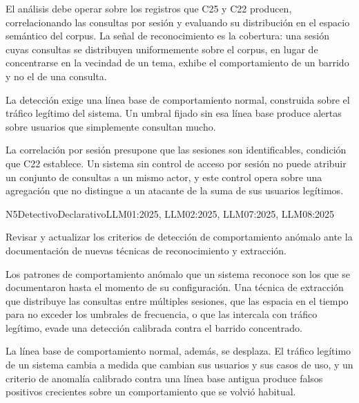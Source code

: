 El análisis debe operar sobre los registros que C25 y C22 producen, correlacionando las consultas por sesión y evaluando su distribución en el espacio semántico del corpus. La señal de reconocimiento es la cobertura: una sesión cuyas consultas se distribuyen uniformemente sobre el corpus, en lugar de concentrarse en la vecindad de un tema, exhibe el comportamiento de un barrido y no el de una consulta.

La detección exige una línea base de comportamiento normal, construida sobre el tráfico legítimo del sistema. Un umbral fijado sin esa línea base produce alertas sobre usuarios que simplemente consultan mucho.

La correlación por sesión presupone que las sesiones son identificables, condición que C22 establece. Un sistema sin control de acceso por sesión no puede atribuir un conjunto de consultas a un mismo actor, y este control opera sobre una agregación que no distingue a un atacante de la suma de sus usuarios legítimos.


  {N5}{Detectivo}{Declarativo}{LLM01:2025, LLM02:2025, LLM07:2025, LLM08:2025}

Revisar y actualizar los criterios de detección de comportamiento anómalo ante la documentación de nuevas técnicas de reconocimiento y extracción.

Los patrones de comportamiento anómalo que un sistema reconoce son los que se documentaron hasta el momento de su configuración. Una técnica de extracción que distribuye las consultas entre múltiples sesiones, que las espacia en el tiempo para no exceder los umbrales de frecuencia, o que las intercala con tráfico legítimo, evade una detección calibrada contra el barrido concentrado.

La línea base de comportamiento normal, además, se desplaza. El tráfico legítimo de un sistema cambia a medida que cambian sus usuarios y sus casos de uso, y un criterio de anomalía calibrado contra una línea base antigua produce falsos positivos crecientes sobre un comportamiento que se volvió habitual.

